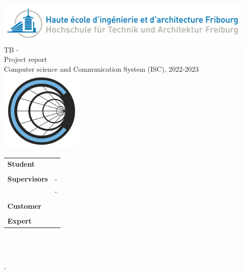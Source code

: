 
\begin{titlepage}
{\selectfont
    \begin{center}
	    \includegraphics[width=0.95\textwidth]{05-resources/img/heiafr_logo}
		~\\[1.5cm]
		{
			\Huge
			TB - \ThesisTitle\\Project report \\[0.5cm]
			\large Computer science and Communication System (ISC), 2022-2023\\[2cm]
		}
		\includegraphics[width=0.30\textwidth]{05-resources/img/logo.png}
		~\\[2cm]
		{
			\begin{center}
			\begin{tabularx}{\textwidth} { %
				>{\raggedright\arraybackslash}X
				>{\raggedright\arraybackslash}X  }
					 \textbf{Student} & \Author\\
					 & \\
					 \textbf{Supervisors} & \Advisor \space - \AdvisorSchool \\ & \AdvisorTwo \space - \AdvisorTwoSchool \\
					 & \\
					 \textbf{Customer} & \Mendant\\
					 & \\
					 \textbf{Expert} & \Expert\\
			\end{tabularx}
			\end{center}
			~\\[1.5cm]
		}

		\vfill



	    {\reportVersion}\\
		{\large \Place, \Date}

	\end{center}
}
\restoregeometry
\end{titlepage}




